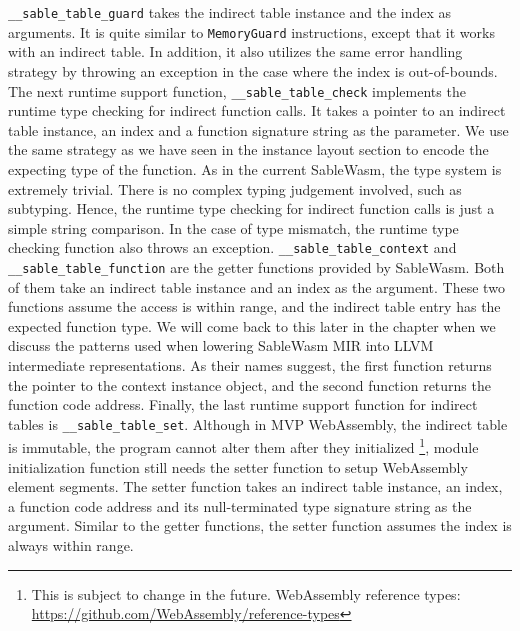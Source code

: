 \texttt{\_\_sable\_table\_guard} takes the indirect table instance and the index as arguments. It is quite similar to \texttt{MemoryGuard} instructions, except that it works with an indirect table. In addition, it also utilizes the same error handling strategy by throwing an exception in the case where the index is out-of-bounds. The next runtime support function, \texttt{\_\_sable\_table\_check} implements the runtime type checking for indirect function calls. It takes a pointer to an indirect table instance, an index and a function signature string as the parameter. We use the same strategy as we have seen in the instance layout section to encode the expecting type of the function. As in the current SableWasm, the type system is extremely trivial. There is no complex typing judgement involved, such as subtyping. Hence, the runtime type checking for indirect function calls is just a simple string comparison. In the case of type mismatch, the runtime type checking function also throws an exception. \texttt{\_\_sable\_table\_context} and \texttt{\_\_sable\_table\_function} are the getter functions provided by SableWasm. Both of them take an indirect table instance and an index as the argument. These two functions assume the access is within range, and the indirect table entry has the expected function type. We will come back to this later in the chapter when we discuss the patterns used when lowering SableWasm MIR into LLVM intermediate representations. As their names suggest, the first function returns the pointer to the context instance object, and the second function returns the function code address. Finally, the last runtime support function for indirect tables is \texttt{\_\_sable\_table\_set}. Although in MVP WebAssembly, the indirect table is immutable, the program cannot alter them after they initialized \footnote{This is subject to change in the future. WebAssembly reference types:\\\url{https://github.com/WebAssembly/reference-types}}, module initialization function still needs the setter function to setup WebAssembly element segments. The setter function takes an indirect table instance, an index, a function code address and its null-terminated type signature string as the argument. Similar to the getter functions, the setter function assumes the index is always within range.

